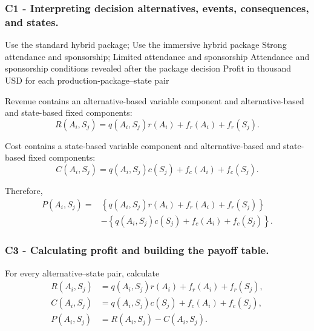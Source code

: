 \subsubsection*{C1 - Interpreting decision alternatives, events, consequences, and states.}
\label{subsec:problem17-hybrid-conference-production-c1}

\DecisionElementsTable
{Use the standard hybrid package; Use the immersive hybrid package}
{Strong attendance and sponsorship; Limited attendance and sponsorship}
{Attendance and sponsorship conditions revealed after the package decision}
{Profit in thousand USD for each production-package--state pair}

Revenue contains an alternative-based variable component and
alternative-based and state-based fixed components:
\[
R(A_i,S_j)
=
q(A_i,S_j)r(A_i)
+
f_r(A_i)
+
f_r(S_j).
\]

Cost contains a state-based variable component and alternative-based and
state-based fixed components:
\[
C(A_i,S_j)
=
q(A_i,S_j)c(S_j)
+
f_c(A_i)
+
f_c(S_j).
\]

Therefore,
\[
\begin{aligned}
	P(A_i,S_j)
	={}&
	\left\{
	q(A_i,S_j)r(A_i)
	+
	f_r(A_i)
	+
	f_r(S_j)
	\right\}
	\\
	&-
	\left\{
	q(A_i,S_j)c(S_j)
	+
	f_c(A_i)
	+
	f_c(S_j)
	\right\}.
\end{aligned}
\]


\subsubsection*{C3 - Calculating profit and building the payoff table.}
\label{subsec:problem17-hybrid-conference-production-c3}

For every alternative--state pair, calculate
\[
\begin{aligned}
	R(A_i,S_j)
	&=
	q(A_i,S_j)r(A_i)
	+
	f_r(A_i)
	+
	f_r(S_j),
	\\
	C(A_i,S_j)
	&=
	q(A_i,S_j)c(S_j)
	+
	f_c(A_i)
	+
	f_c(S_j),
	\\
	P(A_i,S_j)
	&=
	R(A_i,S_j)-C(A_i,S_j).
\end{aligned}
\]

